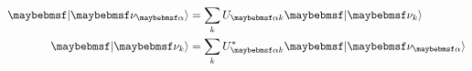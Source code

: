 \begin{align} %
    \ket{\nu_{\alpha}} & = \sum_{k}U_{\alpha k} \ket{\nu_{k}}          \\
    \ket{\nu_{k}}      & = \sum_{k}U_{\alpha k}^{*} \ket{\nu_{\alpha}}
\end{align} %


